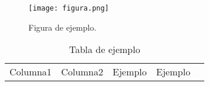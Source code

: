\begin{figure}[H]
    \centering
    \texttt{[image: figura.png]}
    \caption{Figura de ejemplo.}
    \label{fig:ejemplo}
\end{figure}

\begin{table}[H]
    \centering
    \caption{Tabla de ejemplo}
    \label{tab:ejemplo}
    \begin{tabu} to \linewidth{|L|L|}
	\hline
	Columna1 & Columna2 &
	\hline
	Ejemplo & Ejemplo &
	\hline
    \end{tabu}
\end{table}
